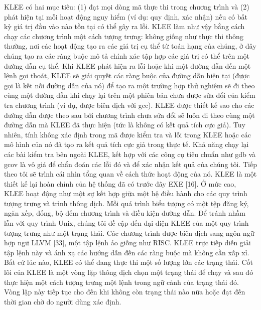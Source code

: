 \documentclass[12pt,a4paper]{article}
\begin{document}
\indent KLEE có hai mục tiêu: (1) đạt mọi dòng mã thực thi trong chương trình và (2) phát hiện tại mỗi hoạt động nguy hiểm (ví dụ: quy định, xác nhận) nếu có bất kỳ giá trị đầu vào nào tồn tại có thể gây ra lỗi. KLEE làm như vậy bằng cách chạy các chương trình một cách tượng trưng: không giống như thực thi thông thường, nơi các hoạt động tạo ra các giá trị cụ thể từ toán hạng của chúng, ở đây chúng tạo ra các ràng buộc mô tả chính xác tập hợp các giá trị có thể trên một đường dẫn cụ thể. Khi KLEE phát hiện ra lỗi hoặc khi một đường dẫn đến một lệnh gọi thoát, KLEE sẽ giải quyết các ràng buộc của đường dẫn hiện tại (được gọi là kết nối đường dẫn của nó) để tạo ra một trường hợp thử nghiệm sẽ đi theo cùng một đường dẫn khi chạy lại trên một phiên bản chưa được sửa đổi của kiểm tra chương trình (ví dụ, được biên dịch với gcc).\newline
\indent KLEE được thiết kế sao cho các đường dẫn được theo sau bởi chương trình chưa sửa đổi sẽ luôn đi theo cùng một đường dẫn mà KLEE đã thực hiện (tức là không có kết quả tích cực giả). Tuy nhiên, tính không xác định trong mã được kiểm tra và lỗi trong KLEE hoặc các mô hình của nó đã tạo ra kết quả tích cực giả trong thực tế. Khả năng chạy lại các bài kiểm tra bên ngoài KLEE, kết hợp với các công cụ tiêu chuẩn như gdb và gcov là vô giá để chẩn đoán các lỗi đó và để xác nhận kết quả của chúng tôi.\newline
\indent Tiếp theo tôi sẽ trình cái nhìn tổng quan về cách thức hoạt động của nó.\newline
\indent KLEE là một thiết kế lại hoàn chỉnh của hệ thống đã có trước đây EXE [16]. Ở mức cao, KLEE hoạt động như một sự kết hợp giữa một hệ điều hành cho các quy trình tượng trưng và trình thông dịch. Mỗi quá trình biểu tượng có một tệp đăng ký, ngăn xếp, đống, bộ đếm chương trình và điều kiện đường dẫn. Để tránh nhầm lẫn với quy trình Unix, chúng tôi đề cập đến đại diện KLEE của một quy trình tượng trưng như một trạng thái. Các chương trình được biên dịch sang ngôn ngữ hợp ngữ LLVM [33], một tập lệnh ảo giống như RISC. KLEE trực tiếp diễn giải tập lệnh này và ánh xạ các hướng dẫn đến các ràng buộc mà không cần xấp xỉ.\newline
\indent Bất cứ lúc nào, KLEE có thể đang thực thi một số lượng lớn các trạng thái. Cốt lõi của KLEE là một vòng lặp thông dịch chọn một trạng thái để chạy và sau đó thực hiện một cách tượng trưng một lệnh trong ngữ cảnh của trạng thái đó. Vòng lặp này tiếp tục cho đến khi không còn trạng thái nào nữa hoặc đạt đến thời gian chờ do người dùng xác định.\newline
\end{document}
